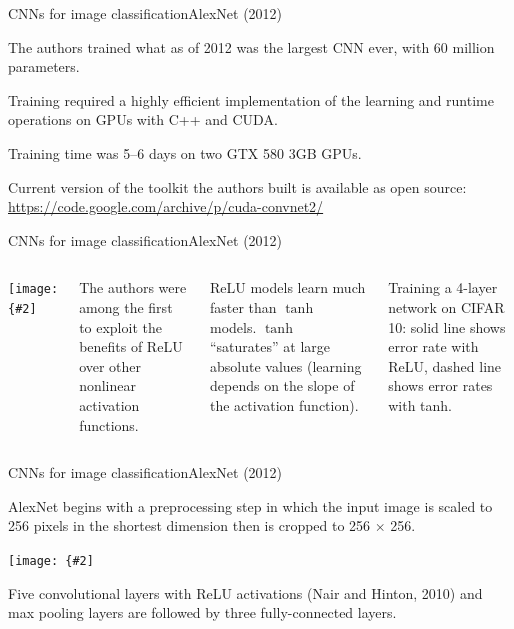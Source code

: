 \documentclass[aspectratio=169]{beamer}
\newcommand{\myfig}[3]{\centerline{\texttt{[image: \{\#2]}}}
\begin{document}
\begin{frame}{CNNs for image classification}{AlexNet (2012)}

  The authors trained what as of 2012 was the largest CNN ever, with
  60 million parameters.

  \medskip

  Training required a highly efficient implementation of the learning
  and runtime operations on GPUs with C++ and CUDA.

  \medskip

  Training time was 5--6 days on two GTX 580 3GB GPUs.
  
  \medskip

  Current version of the toolkit the authors built is available as
  open source: \url{https://code.google.com/archive/p/cuda-convnet2/}
  
\end{frame}


\begin{frame}{CNNs for image classification}{AlexNet (2012)}

  \begin{columns}

    \column{2.2in}
    
    \myfig{2in}{krizhevsky-fig1}{Krizhevsky et al.\ (2012), Fig.\ 1}

    \column{2.3in}
    
    The authors were among the first to exploit the benefits of ReLU
    over other nonlinear activation functions.

    \medskip

    ReLU models learn much faster than $\tanh$ models. $\tanh$
    ``saturates'' at large absolute values (learning depends on the
    slope of the activation function).

    \medskip
  
    Training a 4-layer network on CIFAR 10: solid line shows error
    rate with ReLU, dashed line shows error rates with tanh.

  \end{columns}
  
\end{frame}


\begin{frame}{CNNs for image classification}{AlexNet (2012)}

  AlexNet begins with a preprocessing step in which the input image is
  scaled to 256 pixels in the shortest dimension then is cropped to
  256 $\times$ 256.

  \medskip

  \myfig{4.5in}{alexnet-fig2}{Krizhevsky, Sutskever, and Hinton,
    (2012), Fig.\ 2}

  \medskip

  Five convolutional layers with ReLU activations (Nair and Hinton,
  2010) and max pooling layers are followed by three fully-connected
  layers.

\end{frame}
\end{document}
